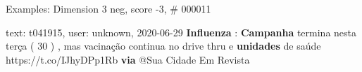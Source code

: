 \begin{frame}{Examples: Dimension 3 neg, score -3, \# 000011}
\footnotesize
\begin{alertblock}{text: t041915, user: unknown, 2020-06-29}
\textbf{Influenza} : \textbf{Campanha} termina nesta terça ( 30 ) , mas 
vacinação continua no drive thru e \textbf{unidades} de saúde 
https://t.co/IJhyDPp1Rb \textbf{via} @Sua Cidade Em Revista 
\end{alertblock}
\end{frame}
